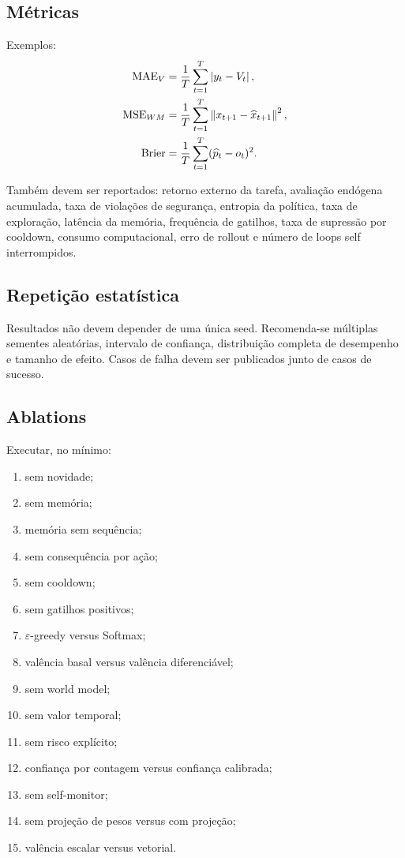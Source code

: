 \subsection{Métricas}

Exemplos:
\begin{align}
\mathrm{MAE}_V&=\frac1T\sum_{t=1}^T\left\lvert y_t-V_t \right\rvert,\\
\mathrm{MSE}_{WM}&=\frac1T\sum_{t=1}^T\left\lVert x_{t+1}-\widehat x_{t+1} \right\rVert^2,\\
\mathrm{Brier}&=\frac1T\sum_{t=1}^T(\widehat p_t-o_t)^2.
\end{align}

Também devem ser reportados: retorno externo da tarefa, avaliação endógena acumulada, taxa de violações de segurança, entropia da política, taxa de exploração, latência da memória, frequência de gatilhos, taxa de supressão por cooldown, consumo computacional, erro de rollout e número de loops self interrompidos.

\subsection{Repetição estatística}

Resultados não devem depender de uma única seed. Recomenda-se múltiplas sementes aleatórias, intervalo de confiança, distribuição completa de desempenho e tamanho de efeito. Casos de falha devem ser publicados junto de casos de sucesso.

\subsection{Ablations}

Executar, no mínimo:
\begin{enumerate}
\item sem novidade;
\item sem memória;
\item memória sem sequência;
\item sem consequência por ação;
\item sem cooldown;
\item sem gatilhos positivos;
\item \(\varepsilon\)-greedy versus Softmax;
\item valência basal versus valência diferenciável;
\item sem world model;
\item sem valor temporal;
\item sem risco explícito;
\item confiança por contagem versus confiança calibrada;
\item sem self-monitor;
\item sem projeção de pesos versus com projeção;
\item valência escalar versus vetorial.
\end{enumerate}

